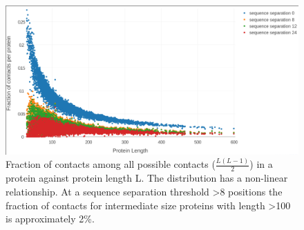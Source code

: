 \documentclass[12pt,a4paper,twoside]{book}
\theoremstyle{definition}
\theoremstyle{definition}
\theoremstyle{remark}
\begin{document}
\begin{figure}

{\centering \includegraphics[width=0.8\linewidth]{img/random_forest_contact_prior/fraction_contacts_vs_protein_length_thr8} 

}

\caption{Fraction of contacts
among all possible contacts (\(\frac{L(L-1)}{2}\)) in a protein against
protein length L. The distribution has a non-linear relationship. At a
sequence separation threshold \textgreater{}8 positions the fraction of
contacts for intermediate size proteins with length \textgreater{}100 is
approximately 2\%.}\label{fig:fraction-contacts-vs-protein-length}
\end{figure}
\end{document}
